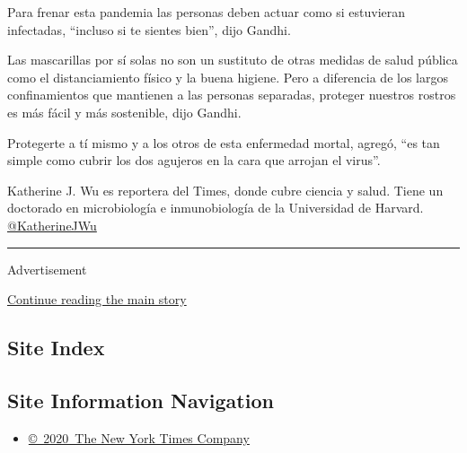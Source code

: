 Para frenar esta pandemia las personas deben actuar como si estuvieran
infectadas, ``incluso si te sientes bien'', dijo Gandhi.

Las mascarillas por sí solas no son un sustituto de otras medidas de
salud pública como el distanciamiento físico y la buena higiene. Pero a
diferencia de los largos confinamientos que mantienen a las personas
separadas, proteger nuestros rostros es más fácil y más sostenible, dijo
Gandhi.

Protegerte a tí mismo y a los otros de esta enfermedad mortal, agregó,
``es tan simple como cubrir los dos agujeros en la cara que arrojan el
virus''.

Katherine J. Wu es reportera del Times, donde cubre ciencia y salud.
Tiene un doctorado en microbiología e inmunobiología de la Universidad
de Harvard. \href{https://twitter.com/KatherineJWu}{@KatherineJWu}

\begin{center}\rule{0.5\linewidth}{\linethickness}\end{center}

Advertisement

\protect\hyperlink{after-bottom}{Continue reading the main story}

\hypertarget{site-index}{%
\subsection{Site Index}\label{site-index}}

\hypertarget{site-information-navigation}{%
\subsection{Site Information
Navigation}\label{site-information-navigation}}

\begin{itemize}
\tightlist
\item
  \href{https://help.nytimes3xbfgragh.onion/hc/en-us/articles/115014792127-Copyright-notice}{©~2020~The
  New York Times Company}
\end{itemize}

